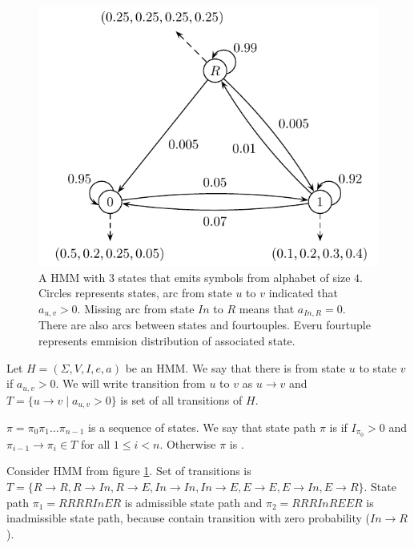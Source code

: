 \begin{figure}
\begin{center}
\includegraphics{../figures/exampleHMM.pdf}
\end{center}
\caption[Example of simple Hidden Markov Model]{
A HMM with $3$ states
that emits symbols from alphabet of size $4$.  Circles represents states, arc
from state $u$ to $v$ indicated that $a_{u,v}>0$. Missing arc from state
$In$ to $R$ means that $a_{In,R}=0$.  There are also arcs between states and
fourtouples. Everu fourtuple represents emmision distribution of associated state.
}\label{FIGURE:EXAMPLEHMM} 
\end{figure}


\begin{definition}\label{DEF:STATEPATH}
Let $H=(\Sigma,V,I,e,a)$ be an HMM. We say that there is 
from state $u$ to state $v$ if $a_{u,v}>0$. We will write transition from $u$ to
$v$ as $u\to v$ and $T=\{u\to v\mid a_{u,v}>0\}$ is set of all transitions of
$H$.

 $\pi=\pi_0\pi_1\dots\pi_{n-1}$ is a sequence of
states. We say that state path $\pi$ is  if $I_{\pi_0}>0$
and  $\pi_{i-1}\to\pi_i\in T$ for all $1\leq i < n$. Otherwise $\pi$ is
.
\end{definition}

\begin{example}
Consider HMM from figure \ref{FIGURE:EXAMPLEHMM}. Set of transitions is
$T=\{R\to R,R\to In, R\to E,In\to In, In\to E, E\to E, E\to In, E\to R\}$.
State path $\pi_1=RRRRInER$ is admissible state path and $\pi_2=RRRInREER$ is inadmissible
state path, because contain transition with zero probability ($In\to R$).
\end{example}



